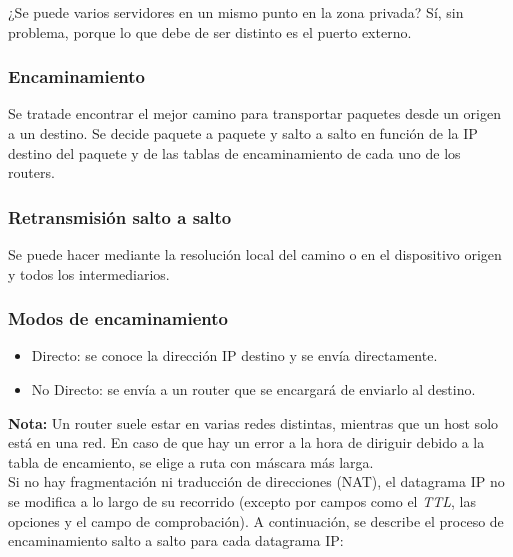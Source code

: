\documentclass[a4paper,12pt]{article}
\begin{document}
\begin{tcolorbox}[colback=blue!5!white,colframe=blue!75!black,title=Pregunta de Examen]
    ¿Se puede varios servidores en un mismo punto en la zona privada?
    Sí, sin problema, porque lo que debe de ser distinto es el puerto externo.
    
\end{tcolorbox}

\subsubsection{Encaminamiento}

Se tratade encontrar el mejor camino para transportar paquetes desde un origen a un destino. Se decide paquete a paquete y salto a salto en función de la IP destino del paquete y de las tablas de encaminamiento de cada uno de los routers.

\subsubsection*{Retransmisión salto a salto}
Se puede hacer mediante la resolución local del camino o en el dispositivo origen y todos los intermediarios.

\subsubsection*{Modos de encaminamiento}
\begin{itemize}
    \item Directo: se conoce la dirección IP destino y se envía directamente.
    \item No Directo: se envía a un router que se encargará de enviarlo al destino.
\end{itemize}

\textbf{Nota:} Un router suele estar en varias redes distintas, mientras que un host solo está en una red. En caso de que hay un error a la hora de diriguir debido a la tabla de encamiento, se elige a ruta con máscara más larga.\\

Si no hay fragmentación ni traducción de direcciones (NAT), el datagrama IP no se modifica a lo largo de su recorrido (excepto por campos como el \textit{TTL}, las opciones y el campo de comprobación). A continuación, se describe el proceso de encaminamiento salto a salto para cada datagrama IP:
\end{document}
